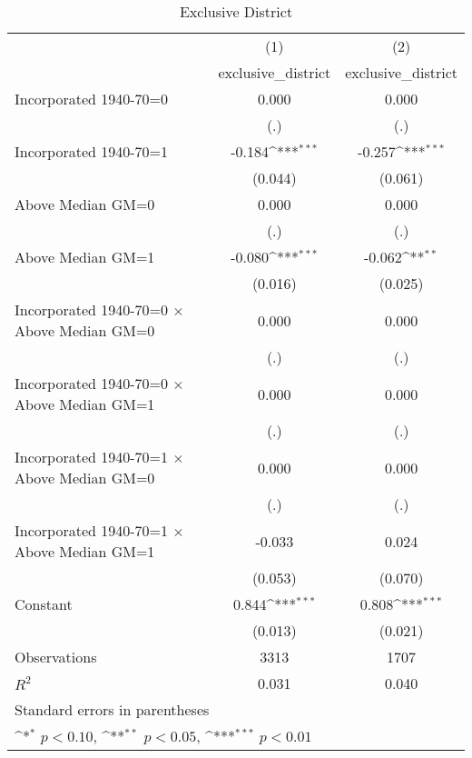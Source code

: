 \begin{table}[htbp]\centering
\def\sym#1{\ifmmode^{#1}\else\(^{#1}\)\fi}
\caption{Exclusive District}
\begin{tabular}{l*{2}{c}}
\hline\hline
                    &\multicolumn{1}{c}{(1)}&\multicolumn{1}{c}{(2)}\\
                    &\multicolumn{1}{c}{exclusive\_district}&\multicolumn{1}{c}{exclusive\_district}\\
\hline
Incorporated 1940-70=0&       0.000         &       0.000         \\
                    &         (.)         &         (.)         \\
[1em]
Incorporated 1940-70=1&      -0.184\sym{***}&      -0.257\sym{***}\\
                    &     (0.044)         &     (0.061)         \\
[1em]
Above Median GM=0   &       0.000         &       0.000         \\
                    &         (.)         &         (.)         \\
[1em]
Above Median GM=1   &      -0.080\sym{***}&      -0.062\sym{**} \\
                    &     (0.016)         &     (0.025)         \\
[1em]
Incorporated 1940-70=0 $\times$ Above Median GM=0&       0.000         &       0.000         \\
                    &         (.)         &         (.)         \\
[1em]
Incorporated 1940-70=0 $\times$ Above Median GM=1&       0.000         &       0.000         \\
                    &         (.)         &         (.)         \\
[1em]
Incorporated 1940-70=1 $\times$ Above Median GM=0&       0.000         &       0.000         \\
                    &         (.)         &         (.)         \\
[1em]
Incorporated 1940-70=1 $\times$ Above Median GM=1&      -0.033         &       0.024         \\
                    &     (0.053)         &     (0.070)         \\
[1em]
Constant            &       0.844\sym{***}&       0.808\sym{***}\\
                    &     (0.013)         &     (0.021)         \\
\hline
Observations        &        3313         &        1707         \\
\(R^{2}\)           &       0.031         &       0.040         \\
\hline\hline
\multicolumn{3}{l}{\footnotesize Standard errors in parentheses}\\
\multicolumn{3}{l}{\footnotesize \sym{*} \(p<0.10\), \sym{**} \(p<0.05\), \sym{***} \(p<0.01\)}\\
\end{tabular}
\end{table}
